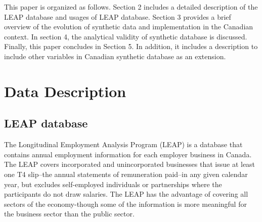 \documentclass{article}
\begin{document}
This paper is organized as follows. Section 2 includes a detailed description of the LEAP database and usages of LEAP database. Section 3 provides a brief overview of the evolution of synthetic data and implementation in the Canadian context. In section 4, the analytical validity of synthetic database is discussed. Finally, this paper concludes in Section 5. In addition, it includes a description to include other variables in Canadian synthetic database as an extension. 

 




\section{Data Description}
\subsection{LEAP database}
The Longitudinal Employment Analysis Program (LEAP) is a database that contains annual employment information for each employer business in Canada. The LEAP covers incorporated and unincorporated businesses that issue at least one T4 slip--the annual statements of remuneration paid--in any given calendar year, but excludes self-employed individuals or partnerships where the participants do not draw salaries. The LEAP has the advantage of covering all sectors of the economy-though some of the information is more meaningful for the business sector than the public sector.
\end{document}
